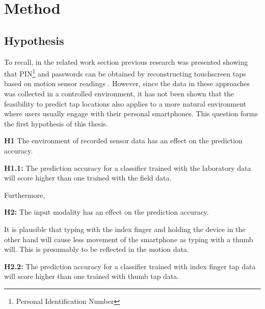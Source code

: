\chapter{Method\label{cha:chapter5}}

\section{Hypothesis}
To recall, in the related work section previous research was presented showing that PIN\footnote{Personal Identification Number} and passwords can be obtained by reconstructing touchscreen taps based on motion sensor readings \cite{Tapprints, Accessory, Touchlogger}. However, since the data in these approaches was collected in a controlled environment, it has not been shown that the feasibility to predict tap locations also applies to a more natural environment where users usually engage with their personal smartphones. This question forms the first hypothesis of this thesis.

\begin{center}
  \begin{mdframed}[backgroundcolor=gray!10] 
    \textbf{H1}  The environment of recorded sensor data has an effect on the prediction accuracy.
  \end{mdframed}
\end{center}

\begin{center}
  \begin{framed}
    \textbf{H1.1:} The prediction accuracy for a classifier trained with the laboratory data will score higher than one trained with the field data.
  \end{framed}
\end{center}

Furthermore, 

\begin{center}
  \begin{mdframed}[backgroundcolor=gray!10]
    \textbf{H2:} The input modality has an effect on the prediction accuracy.
  \end{mdframed}
\end{center}

It is plausible that typing with the index finger and holding the device in the other hand will cause less movement of the smartphone as typing with a thumb will. This is presumably to be reflected in the motion data.

\begin{center}
  \begin{framed}
    \textbf{H2.2:} The prediction accuracy for a classifier trained with index finger tap data will score higher than one trained with thumb tap data.
  \end{framed}
\end{center}

